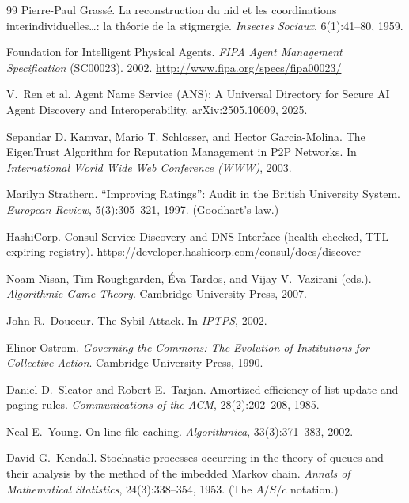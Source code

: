 \documentclass[11pt,a4paper]{article}
\theoremstyle{definition}
\theoremstyle{plain}
\begin{document}
\begin{thebibliography}{99}
Pierre-Paul Grass\'e.
\newblock La reconstruction du nid et les coordinations interindividuelles\ldots: la th\'eorie de la stigmergie.
\newblock \textit{Insectes Sociaux}, 6(1):41--80, 1959.

Foundation for Intelligent Physical Agents.
\newblock \textit{FIPA Agent Management Specification} (SC00023). 2002.
\newblock \url{http://www.fipa.org/specs/fipa00023/}

V.\ Ren et al.
\newblock Agent Name Service (ANS): A Universal Directory for Secure AI Agent Discovery and Interoperability.
\newblock arXiv:2505.10609, 2025.

Sepandar D. Kamvar, Mario T. Schlosser, and Hector Garcia-Molina.
\newblock The EigenTrust Algorithm for Reputation Management in P2P Networks.
\newblock In \textit{International World Wide Web Conference (WWW)}, 2003.

Marilyn Strathern.
\newblock ``Improving Ratings'': Audit in the British University System.
\newblock \textit{European Review}, 5(3):305--321, 1997. (Goodhart's law.)

HashiCorp.
\newblock Consul Service Discovery and DNS Interface (health-checked, TTL-expiring registry).
\newblock \url{https://developer.hashicorp.com/consul/docs/discover}

Noam Nisan, Tim Roughgarden, \'Eva Tardos, and Vijay V.\ Vazirani (eds.).
\newblock \textit{Algorithmic Game Theory}. Cambridge University Press, 2007.

John R.\ Douceur.
\newblock The Sybil Attack.
\newblock In \textit{IPTPS}, 2002.

Elinor Ostrom.
\newblock \textit{Governing the Commons: The Evolution of Institutions for Collective Action}. Cambridge University Press, 1990.

Daniel D.\ Sleator and Robert E.\ Tarjan.
\newblock Amortized efficiency of list update and paging rules.
\newblock \textit{Communications of the ACM}, 28(2):202--208, 1985.

Neal E.\ Young.
\newblock On-line file caching.
\newblock \emph{Algorithmica}, 33(3):371--383, 2002.

David G.\ Kendall.
\newblock Stochastic processes occurring in the theory of queues and their analysis by the method of the imbedded Markov chain.
\newblock \textit{Annals of Mathematical Statistics}, 24(3):338--354, 1953. (The $A/S/c$ notation.)


\end{thebibliography}
\end{document}
